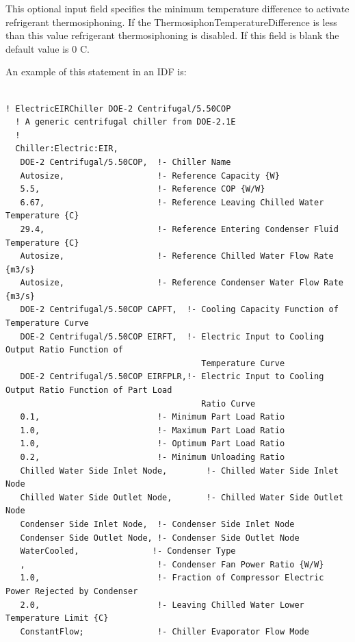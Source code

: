This optional input field specifies the minimum temperature difference to activate refrigerant thermosiphoning. If the ThermosiphonTemperatureDifference is less than this value refrigerant thermosiphoning is disabled. If this field is blank the default value is 0 C.


An example of this statement in an IDF is:

\begin{lstlisting}

! ElectricEIRChiller DOE-2 Centrifugal/5.50COP
  ! A generic centrifugal chiller from DOE-2.1E
  !
  Chiller:Electric:EIR,
   DOE-2 Centrifugal/5.50COP,  !- Chiller Name
   Autosize,                   !- Reference Capacity {W}
   5.5,                        !- Reference COP {W/W}
   6.67,                       !- Reference Leaving Chilled Water Temperature {C}
   29.4,                       !- Reference Entering Condenser Fluid Temperature {C}
   Autosize,                   !- Reference Chilled Water Flow Rate {m3/s}
   Autosize,                   !- Reference Condenser Water Flow Rate {m3/s}
   DOE-2 Centrifugal/5.50COP CAPFT,  !- Cooling Capacity Function of Temperature Curve
   DOE-2 Centrifugal/5.50COP EIRFT,  !- Electric Input to Cooling Output Ratio Function of
                                        Temperature Curve
   DOE-2 Centrifugal/5.50COP EIRFPLR,!- Electric Input to Cooling Output Ratio Function of Part Load
                                        Ratio Curve
   0.1,                        !- Minimum Part Load Ratio
   1.0,                        !- Maximum Part Load Ratio
   1.0,                        !- Optimum Part Load Ratio
   0.2,                        !- Minimum Unloading Ratio
   Chilled Water Side Inlet Node,        !- Chilled Water Side Inlet Node
   Chilled Water Side Outlet Node,       !- Chilled Water Side Outlet Node
   Condenser Side Inlet Node,  !- Condenser Side Inlet Node
   Condenser Side Outlet Node, !- Condenser Side Outlet Node
   WaterCooled,               !- Condenser Type
   ,                           !- Condenser Fan Power Ratio {W/W}
   1.0,                        !- Fraction of Compressor Electric Power Rejected by Condenser
   2.0,                        !- Leaving Chilled Water Lower Temperature Limit {C}
   ConstantFlow;               !- Chiller Evaporator Flow Mode



\end{lstlisting}
